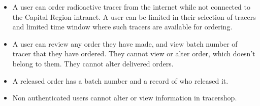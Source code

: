 \documentclass{article}
\begin{document}
\begin{itemize}
  \item A user can order radioactive tracer from the internet while not connected to the Capital Region intranet.
  A user can be limited in their selection of tracers and limited time window where such tracers are available for ordering.
  \item A user can review any order they have made, and view batch number of tracer that they have ordered. They cannot view or alter order, which doesn't belong to them. They cannot alter delivered orders.
  \item A released order has a batch number and a record of who released it.
  \item Non authenticated users cannot alter or view information in tracershop.
\end{itemize}
\end{document}
